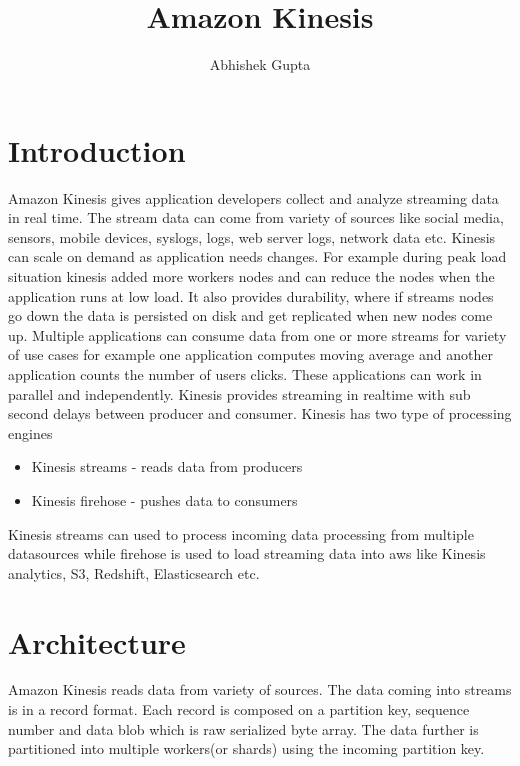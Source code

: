 \documentclass[9pt,twocolumn,twoside]{styles/osajnl}
\title{Amazon Kinesis}
\author[1,*]{Abhishek Gupta}
\affil[1]{School of Informatics and Computing, Bloomington, IN 47408, U.S.A.}
\affil[*]{Corresponding authors: abhigupt@iu.edu}
\begin{document}
\maketitle

\section{Introduction}

Amazon Kinesis \cite{www-kinesis} gives application developers collect and analyze streaming data in real time. The stream data can come from variety of sources like social media, sensors, mobile devices, syslogs, logs, web server logs, network data etc. Kinesis can scale on demand as application needs changes. For example during peak load situation kinesis added more workers nodes and can reduce the nodes when the application runs at low load. It also provides durability, where if streams nodes go down the data is persisted on disk and get replicated when new nodes come up. Multiple applications can consume data from one or more streams for variety of use cases for example one application computes moving average and another application counts the number of users clicks. These applications can work in parallel and independently. Kinesis provides streaming in realtime with sub second delays between producer and consumer. Kinesis has two type of processing engines
\begin{itemize}
	\item Kinesis streams - reads data from producers
	\item Kinesis firehose - pushes data to consumers
\end{itemize}

Kinesis streams can used to process incoming data processing from multiple datasources while firehose is used to load streaming data into aws like Kinesis analytics, S3, Redshift, Elasticsearch etc.

\section{Architecture} 
Amazon Kinesis reads data from variety of sources. The data coming into streams is in a record format. Each record is composed on a partition key, sequence number and data blob which is raw serialized byte array. The data further is partitioned into multiple workers(or shards) using the incoming partition key. 
\end{document}
